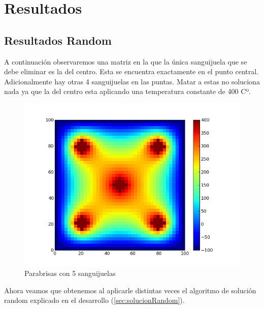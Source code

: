 \section{Resultados}


\subsection{Resultados Random}

A continuación observaremos una matriz en la que la única sanguijuela que se debe eliminar es la del centro. Esta se encuentra exactamente en el punto central. Adicionalmente hay otras 4 sanguijuelas en las puntas. Matar a estas no soluciona nada ya que la del centro esta aplicando una temperatura constante de 400 Cº. 

\begin{figure}[htb]
\begin{center}
\includegraphics[scale=0.70]{imagenes/test5.png} 
\caption{Parabrisas con 5 sanguijuelas} 
\end{center}
\end{figure}


Ahora veamos que obtenemos al aplicarle distintas veces el algoritmo de solución random explicado en el desarrollo (\ref{sec:solucionRandom}).
\newpage

